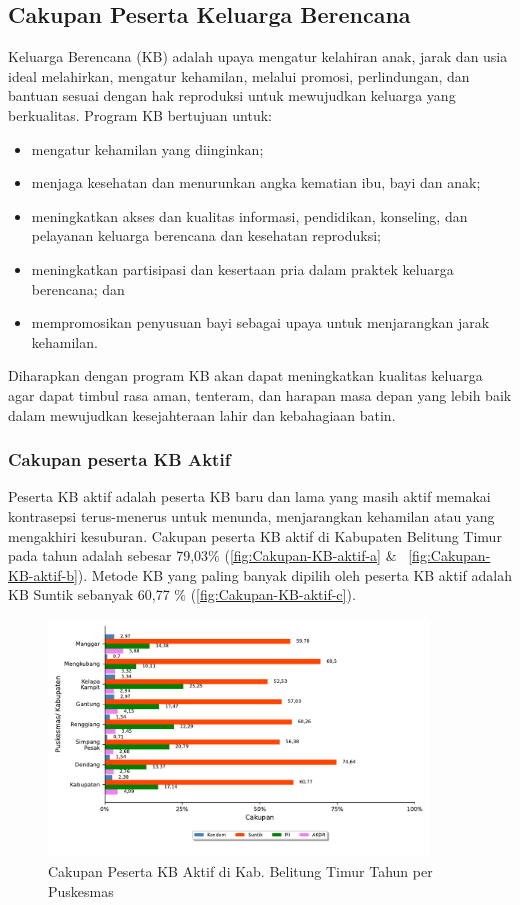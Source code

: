 \subsection{Cakupan Peserta Keluarga Berencana}
Keluarga Berencana (KB) adalah upaya mengatur kelahiran anak, jarak dan usia ideal melahirkan, mengatur kehamilan, melalui promosi, perlindungan, dan bantuan sesuai dengan hak reproduksi untuk mewujudkan keluarga yang berkualitas. Program KB bertujuan untuk:
\begin{itemize}
 \item mengatur kehamilan yang diinginkan;
 \item menjaga kesehatan dan menurunkan angka kematian ibu, bayi dan anak;
 \item meningkatkan akses dan kualitas informasi, pendidikan, konseling, dan pelayanan keluarga berencana dan kesehatan reproduksi;
 \item meningkatkan partisipasi dan kesertaan pria dalam praktek keluarga berencana; dan
 \item mempromosikan penyusuan bayi sebagai upaya untuk menjarangkan jarak kehamilan.
\end{itemize}
Diharapkan dengan program KB akan dapat meningkatkan kualitas keluarga agar dapat timbul rasa aman, tenteram, dan harapan masa depan yang lebih baik dalam mewujudkan kesejahteraan lahir dan kebahagiaan batin.

\subsubsection{Cakupan peserta KB Aktif}
Peserta KB aktif adalah peserta KB baru dan lama yang masih aktif memakai kontrasepsi terus-menerus untuk menunda, menjarangkan kehamilan atau yang mengakhiri kesuburan. Cakupan peserta KB aktif di Kabupaten Belitung Timur pada tahun \tP adalah sebesar 79,03\% (\autoref{fig:Cakupan-KB-aktif-a} \& ~\autoref{fig:Cakupan-KB-aktif-b}). Metode KB yang paling banyak dipilih oleh peserta KB aktif adalah KB Suntik sebanyak 60,77 \% (\autoref{fig:Cakupan-KB-aktif-c}).

\begin{figure}[H]
    \centering
    \includegraphics[width=0.9\textwidth]{bab_05/bab_05_06_KBaktif_a}
    \caption{Cakupan Peserta KB Aktif di Kab. Belitung Timur Tahun \tP per Puskesmas}
    \label{fig:Cakupan-KB-aktif-a}
\end{figure}

